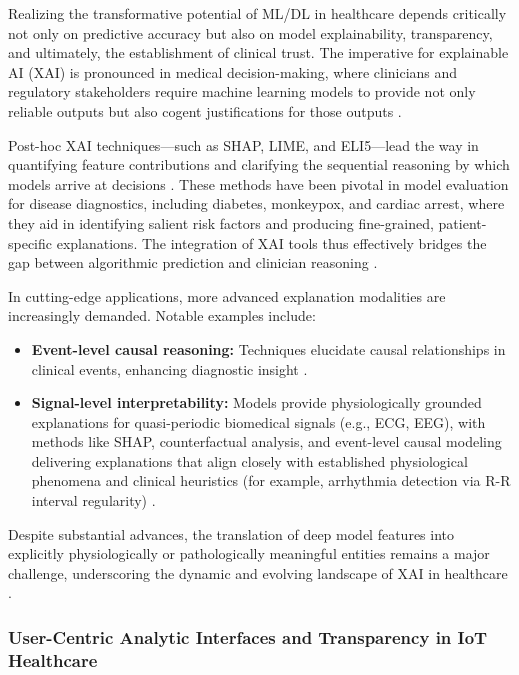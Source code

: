 Realizing the transformative potential of ML/DL in healthcare depends critically not only on predictive accuracy but also on model explainability, transparency, and ultimately, the establishment of clinical trust. The imperative for explainable AI (XAI) is pronounced in medical decision-making, where clinicians and regulatory stakeholders require machine learning models to provide not only reliable outputs but also cogent justifications for those outputs \cite{ref11,ref39,ref50,ref65,ref80}.

Post-hoc XAI techniques—such as SHAP, LIME, and ELI5—lead the way in quantifying feature contributions and clarifying the sequential reasoning by which models arrive at decisions \cite{ref11,ref28,ref36,ref50,ref65}. These methods have been pivotal in model evaluation for disease diagnostics, including diabetes, monkeypox, and cardiac arrest, where they aid in identifying salient risk factors and producing fine-grained, patient-specific explanations. The integration of XAI tools thus effectively bridges the gap between algorithmic prediction and clinician reasoning \cite{ref11,ref28,ref32,ref36,ref39,ref50,ref65,ref98}.

In cutting-edge applications, more advanced explanation modalities are increasingly demanded. Notable examples include:
\begin{itemize}
    \item \textbf{Event-level causal reasoning:} Techniques elucidate causal relationships in clinical events, enhancing diagnostic insight \cite{ref36,ref39}.
    \item \textbf{Signal-level interpretability:} Models provide physiologically grounded explanations for quasi-periodic biomedical signals (e.g., ECG, EEG), with methods like SHAP, counterfactual analysis, and event-level causal modeling delivering explanations that align closely with established physiological phenomena and clinical heuristics (for example, arrhythmia detection via R-R interval regularity) \cite{ref36,ref68,ref39,ref98,ref99}.
\end{itemize}
Despite substantial advances, the translation of deep model features into explicitly physiologically or pathologically meaningful entities remains a major challenge, underscoring the dynamic and evolving landscape of XAI in healthcare \cite{ref98,ref99}.

\subsubsection{User-Centric Analytic Interfaces and Transparency in IoT Healthcare}

